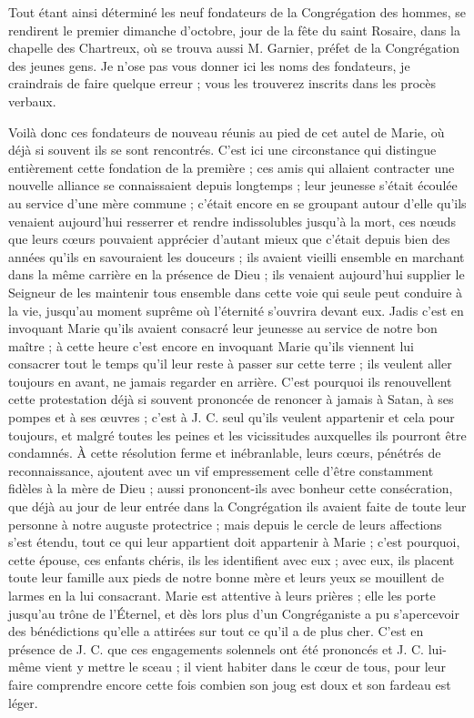 Tout étant ainsi déterminé les neuf fondateurs de la Congrégation des hommes, se rendirent le premier dimanche
d'octobre, jour de la fête du saint Rosaire, dans la chapelle des Chartreux, où se trouva aussi M. Garnier, préfet de la Congrégation des jeunes gens. Je n'ose pas vous donner ici les noms des fondateurs, je craindrais de faire quelque erreur ; vous les trouverez inscrits dans les procès verbaux.

Voilà donc ces fondateurs de nouveau réunis au pied de cet autel de Marie, où déjà si souvent ils se sont rencontrés. C'est ici une circonstance qui distingue entièrement cette fondation de la première ; ces amis qui allaient contracter une nouvelle alliance se connaissaient depuis longtemps ; leur jeunesse s'était écoulée au service d'une mère commune ; c'était encore en se groupant autour d'elle qu'ils venaient aujourd'hui resserrer et rendre indissolubles jusqu'à la mort, ces nœuds que leurs cœurs pouvaient apprécier d'autant mieux que c'était depuis bien des années qu'ils en savouraient les douceurs ; ils avaient vieilli ensemble en marchant dans la même carrière en la présence de Dieu ; ils venaient aujourd'hui supplier le Seigneur de les maintenir tous ensemble dans cette voie qui seule peut conduire à la vie, jusqu'au moment suprême où l'éternité s'ouvrira devant eux. Jadis c'est en invoquant Marie qu'ils avaient consacré leur jeunesse au service de notre bon maître ; à cette heure c'est encore en invoquant Marie qu'ils viennent lui consacrer tout le temps qu'il leur reste à passer sur cette terre ; ils veulent aller toujours en avant, ne jamais regarder en arrière. C'est pourquoi ils renouvellent cette protestation déjà si souvent prononcée de renoncer à jamais à Satan, à ses pompes et à ses œuvres ; c'est à J. C. seul qu'ils veulent
appartenir et cela pour toujours, et malgré toutes les peines et les vicissitudes auxquelles ils pourront être condamnés. À cette résolution ferme et inébranlable, leurs cœurs, pénétrés de reconnaissance, ajoutent avec un vif empressement celle d'être constamment fidèles à la mère de Dieu ; aussi prononcent-ils avec bonheur cette consécration, que déjà au jour de leur entrée dans la Congrégation ils avaient faite de toute leur personne à notre auguste protectrice ; mais depuis le cercle de leurs affections s'est étendu, tout ce qui leur appartient doit appartenir à Marie ; c'est pourquoi, cette épouse, ces enfants chéris, ils les identifient avec eux ; avec eux, ils placent toute leur famille aux pieds de notre bonne mère et leurs yeux se mouillent de larmes en la lui consacrant. Marie est attentive à leurs prières ; elle les porte jusqu'au trône de l'Éternel, et dès lors plus d'un Congréganiste a pu s'apercevoir des bénédictions qu'elle a attirées sur tout ce qu'il a de plus cher. C'est en présence de J. C. que ces engagements solennels ont été prononcés et J. C. lui-même vient y mettre le sceau ; il vient habiter dans le cœur de tous, pour leur faire comprendre encore cette fois combien son joug est doux et son fardeau est léger.

